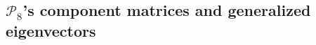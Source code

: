 \subsection{$\mathcal{P}_{8}$'s component matrices and generalized eigenvectors}
\label{subsec:Pascal-component-matrices-generalized-eigenvectors}



\iffalse %


\fi



